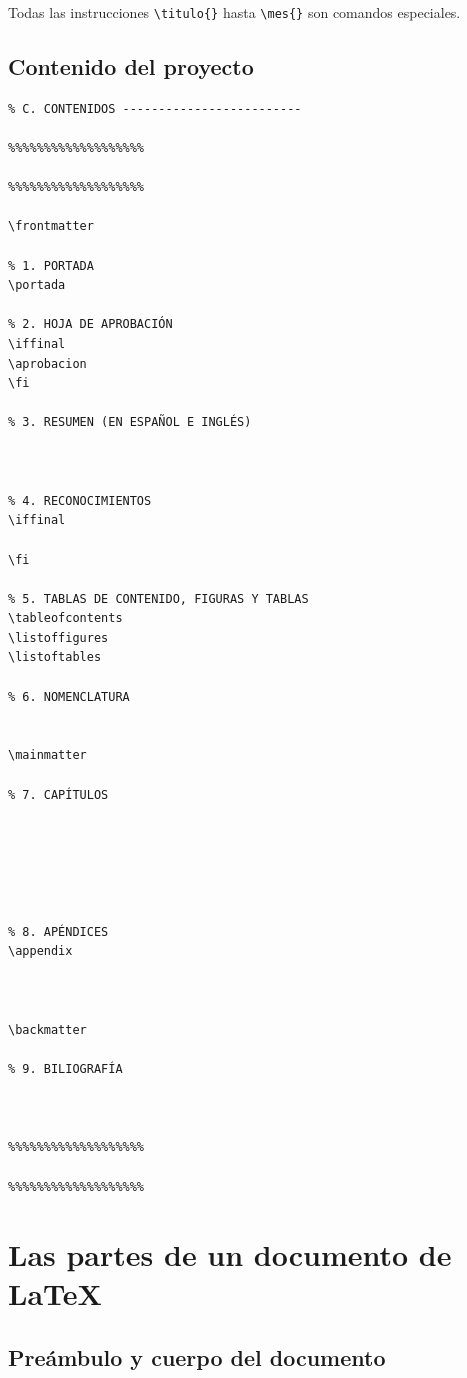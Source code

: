 Todas las instrucciones \verb+\titulo{}+ hasta \verb+\mes{}+ son comandos especiales.

\subsection{Contenido del proyecto}

\begin{verbatim}
% C. CONTENIDOS -------------------------

%%%%%%%%%%%%%%%%%%%

%%%%%%%%%%%%%%%%%%%

\frontmatter

% 1. PORTADA
\portada

% 2. HOJA DE APROBACIÓN
\iffinal
\aprobacion
\fi

% 3. RESUMEN (EN ESPAÑOL E INGLÉS)



% 4. RECONOCIMIENTOS
\iffinal

\fi

% 5. TABLAS DE CONTENIDO, FIGURAS Y TABLAS
\tableofcontents
\listoffigures
\listoftables

% 6. NOMENCLATURA


\mainmatter

% 7. CAPÍTULOS






% 8. APÉNDICES
\appendix



\backmatter

% 9. BILIOGRAFÍA



%%%%%%%%%%%%%%%%%%%

%%%%%%%%%%%%%%%%%%%
\end{verbatim}

\section{Las partes de un documento de \LaTeX}

\subsection{Preámbulo y cuerpo del documento}

